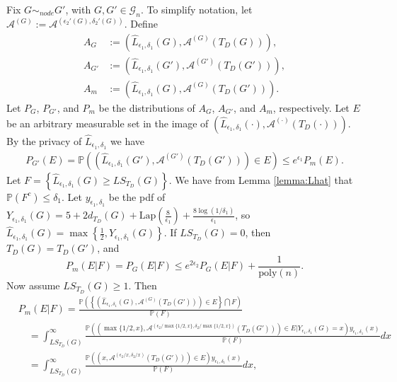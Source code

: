 \documentclass{article}
\begin{document}
Fix $G \sim_{node} G'$, with $G, G' \in \mathcal{G}_n$. To simplify notation, let $\mathcal{A}^{(G)} := \mathcal{A}^{(\epsilon_2'(G), \delta_2'(G))}$. Define
\begin{align*}
A_G & := (\hat{L}_{\epsilon_1, \delta_1}(G), \mathcal{A}^{(G)}(T_D(G))), \\
%
A_{G'} & := (\hat{L}_{\epsilon_1, \delta_1}(G'), \mathcal{A}^{(G')}(T_D(G'))), \\
%
A_m & := (\hat{L}_{\epsilon_1, \delta_1}(G), \mathcal{A}^{(G)}(T_D(G'))).
\end{align*}
Let $P_G$, $P_{G'}$, and $P_m$ be the distributions of $A_G$, $A_{G'}$, and $A_m$, respectively. 
Let $E$ be an arbitrary measurable set in the image of $(\hat{L}_{\epsilon_1, \delta_1}(\cdot), \mathcal{A}^{(\cdot)}(T_D(\cdot)))$. By the privacy of $\hat{L}_{\epsilon_1, \delta_1}$ we have
\begin{align*}
P_{G'}(E) = \mathbb{P}\left((\hat{L}_{\epsilon_1, \delta_1}(G'), \mathcal{A}^{(G')}(T_D(G'))) \in E\right) \leq e^{\epsilon_1}P_m(E). 
\end{align*}
Let $F = \left\{\hat{L}_{\epsilon_1, \delta_1}(G) \geq LS_{{T_D}}(G) \right\}$. We have from Lemma \ref{lemma:Lhat} that $\mathbb{P}(F^c) \leq \delta_1$. Let $y_{\epsilon_1, \delta_1}$ be the pdf of $Y_{\epsilon_1, \delta_1}(G) = 5 + 2 d_{T_D}(G) + \mathrm{Lap}\left(\frac{8}{\epsilon_1}\right) + \frac{8 \log(1/\delta_1)}{\epsilon_1}$, so $\hat{L}_{\epsilon_1, \delta_1}(G) = \max\left\{\frac{1}{2}, Y_{\epsilon_1, \delta_1}(G)\right\}$. If $LS_{T_D}(G) = 0$, then $T_D(G) = T_D(G')$, and
\begin{equation*}
P_m(E|F) = P_G(E|F) \leq e^{2\epsilon_2} P_G(E|F) + \frac{1}{\mathrm{poly}(n)}.
\end{equation*}
Now assume $LS_{T_D}(G) \geq 1$. Then
\begin{align*}
& P_{m}(E|F) = \frac{\mathbb{P}\left(\left\{(\hat{L}_{\epsilon_1, \delta_1}(G), \mathcal{A}^{(G)}(T_D(G')))\in E\right\} \bigcap F\right)}{\mathbb{P}(F)}\\
& \quad = \int_{LS_{{T_D}}(G)}^{\infty}\frac{\mathbb{P}\left((\max\{1/2, x\}, \mathcal{A}^{(\epsilon_2/\max\{1/2, x\}, \delta_2/\max\{1/2, x\})}(T_D(G'))) \in E|Y_{\epsilon_1, \delta_1}(G) = x\right)y_{\epsilon_1, \delta_1}(x)}{\mathbb{P}(F)}dx\\
& \quad = \int_{LS_{{T_D}}(G)}^{\infty}\frac{\mathbb{P}\left((x, \mathcal{A}^{(\epsilon_2/x, \delta_2/x)}(T_D(G'))) \in E\right)y_{\epsilon_1, \delta_1}(x)}{\mathbb{P}(F)}dx,
\end{align*}
\end{document}
